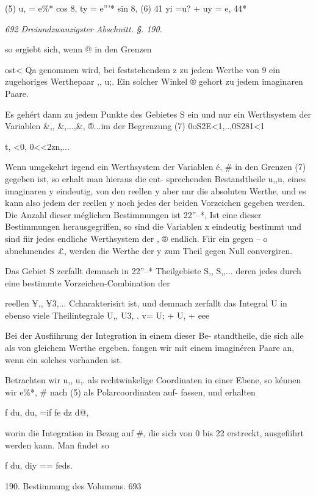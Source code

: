 \documentclass[12pt,a4paper]{article}
\theoremstyle{plain}
\theoremstyle{definition}
\begin{document}
(5) u, = e\%* cos 8, ty = e'''* sin 8, (6) 41 yi =u? + uy = e, 44*

\vspace{0.5\baselineskip}\noindent\textit{692 Dreiundzwanzigster Abschnitt. §. 190.}\par

so ergiebt sich, wenn @ in den Grenzen

ost< Qa genommen wird, bei feststehendem z zu jedem Werthe von 9 ein zugehoriges Werthepaar ,, u;. Ein solcher Winkel ® gehort zu jedem imaginaren Paare.

Es gehért dann zu jedem Punkte des Gebietes S ein und nur ein Werthsystem der Variablen \&,, \&,...,\&, ®...im der Begrenzung (7) 0oS2E<1,..,0S281<1

t, <0, 0<<2zn,...

Wenn umgekehrt irgend ein Werthsystem der Variablen é, \# in den Grenzen (7) gegeben ist, so erhalt man hieraus die ent- sprechenden Bestandtheile u,,u, eines imaginaren y eindeutig, von den reellen y aber nur die absoluten Werthe, und es kann also jedem der reellen y noch jedes der beiden Vorzeichen gegeben werden. Die Anzahl dieser méglichen Bestimmungen ist 22''--*, Ist eine dieser Bestimmungen herausgegriffen, so sind die Variablen x eindeutig bestimmt und sind fiir jedes endliche Werthsystem der , ® endlich. Fiir ein gegen -- o abnehmendes £, werden die Werthe der y zum Theil gegen Null convergiren.

Das Gebiet S zerfallt demnach in 22''--* Theilgebiete S,, S,,... deren jedes durch eine bestimmte Vorzeichen-Combination der

reellen ¥,, ¥3,... Ccharakterisirt ist, und demnach zerfallt das Integral U in ebenso viele Theilintegrale U,, U3, . v= U; + U, + eee

Bei der Ausfiihrung der Integration in einem dieser Be- standtheile, die sich alle als von gleichem Werthe ergeben. fangen wir mit einem imaginéren Paare an, wenn ein solches vorhanden ist.

Betrachten wir u,, u,. als rechtwinkelige Coordinaten in einer Ebene, so kénnen wir e\%*, \# nach (5) als Polarcoordinaten auf- fassen, und erhalten

f du, du, =if fe dz d@,

worin die Integration in Bezug auf \#, die sich von 0 bis 22 erstreckt, ausgefiihrt werden kann. Man findet so

f du, diy == feds.

190. Bestimmung des Volumens. 693
\end{document}
